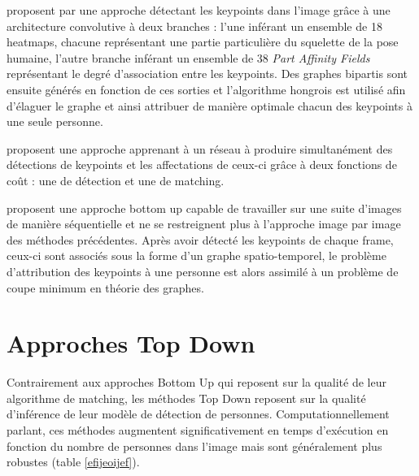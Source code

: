 \cite{cao2017realtime} proposent par une approche détectant les keypoints dans l'image grâce à une architecture convolutive à deux branches : l'une inférant un ensemble de 18 heatmaps, chacune représentant une partie particulière du squelette de la pose humaine, l'autre branche inférant un ensemble de 38 \textit{Part Affinity Fields} représentant le degré d'association entre les keypoints. Des graphes bipartis sont ensuite générés en fonction de ces sorties et l'algorithme hongrois est utilisé afin d'élaguer le graphe et ainsi attribuer de manière optimale chacun des keypoints à une seule personne.

\cite{627f7b8a4a3441f28d400cfbd7a32b80} proposent une approche apprenant à un réseau à produire simultanément des détections de keypoints et les affectations de ceux-ci grâce à deux fonctions de coût : une de détection et une de matching.

\cite{DBLP:journals/corr/InsafutdinovAPT16} proposent une approche bottom up capable de travailler sur une suite d'images de manière séquentielle et ne se restreignent plus à l'approche image par image des méthodes précédentes. Après avoir détecté les keypoints de chaque frame, ceux-ci sont associés sous la forme d'un graphe spatio-temporel, le problème d'attribution des keypoints à une personne est alors assimilé à un problème de coupe minimum en théorie des graphes.

\section{Approches Top Down}
Contrairement aux approches Bottom Up qui reposent sur la qualité de leur algorithme de matching, les méthodes Top Down reposent sur la qualité d'inférence de leur modèle de détection de personnes. Computationnellement parlant, ces méthodes augmentent significativement en temps d'exécution en fonction du nombre de personnes dans l'image mais sont généralement plus robustes (table \ref{efijeoijef}).

